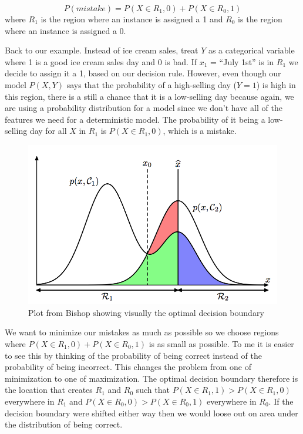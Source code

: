 \documentclass[paper=a4, fontsize=11pt]{scrartcl} %
\numberwithin{equation}{section} %
\numberwithin{figure}{section} %
\numberwithin{table}{section} %
\begin{document}
\begin{equation}
P(mistake) = P(X\in R_1, 0) + P(X\in R_0, 1)
\end{equation}
where $R_1$ is the region where an instance is assigned a 1 and $R_0$ is the region where an instance is assigned a 0.

Back to our example. Instead of ice cream sales, treat $Y$ as a categorical variable where 1 is a good ice cream sales day and 0 is bad.  If $x_1$ = ``July 1st'' is in $R_1$ we decide to assign it a 1, based on our decision rule. However, even though our model $P(X,Y)$ says that the probability of a high-selling day ($Y=1$) is high in this region, there is a still a chance that it is a low-selling day because again, we are using a probability distribution for a model since we don't have all of the features we need for a deterministic model. The probability of it being a low-selling day for all $X$ in $R_1$ is $P(X\in R_1, 0)$, which is a mistake.

 \begin{figure}[t] \label{fig:bishop_optimal_distributions}
\caption{Plot from Bishop showing visually the optimal decision boundary}
\centering
 \includegraphics[scale=.7]{bishop_optimal_distributions.png}
 \end{figure}
 
We want to minimize our mistakes as much as possible so we choose regions where $P(X\in R_1, 0) + P(X\in R_0, 1)$ is as small as possible. To me it is easier to see this by thinking of the probability of being correct instead of the probability of being incorrect. This changes the problem from one of minimization to one of maximization. The optimal decision boundary therefore is the location that creates $R_1$ and $R_0$ such that $P(X\in R_1, 1) >  P(X\in R_1, 0)$ everywhere in $R_1$ and $P(X\in R_0, 0) >  P(X\in R_0, 1)$ everywhere in $R_0$. If the decision boundary were shifted either way then we would loose out on area under the distribution of being correct. 
\end{document}
